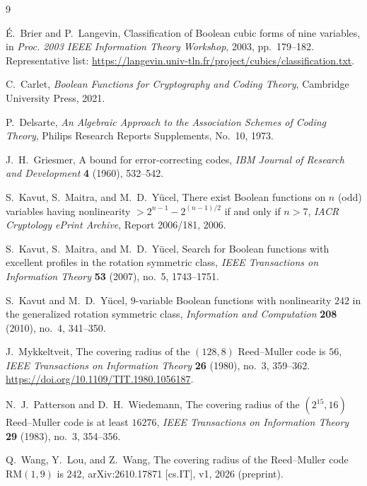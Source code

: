 \documentclass[11pt]{article}
\theoremstyle{definition}
\begin{document}
\begin{thebibliography}{9}

\'E.~Brier and P.~Langevin,
Classification of Boolean cubic forms of nine variables,
in \emph{Proc. 2003 IEEE Information Theory Workshop}, 2003, pp.~179--182.
Representative list: \url{https://langevin.univ-tln.fr/project/cubics/classification.txt}.

C.~Carlet,
\emph{Boolean Functions for Cryptography and Coding Theory},
Cambridge University Press, 2021.

P.~Delsarte,
\emph{An Algebraic Approach to the Association Schemes of Coding Theory},
Philips Research Reports Supplements, No.~10, 1973.

J.~H.~Griesmer,
A bound for error-correcting codes,
\emph{IBM Journal of Research and Development} \textbf{4} (1960), 532--542.

S.~Kavut, S.~Maitra, and M.~D.~Y\"ucel,
There exist Boolean functions on $n$ (odd) variables having nonlinearity $> 2^{n-1} - 2^{(n-1)/2}$ if and only if $n > 7$,
\emph{IACR Cryptology ePrint Archive}, Report 2006/181, 2006.

S.~Kavut, S.~Maitra, and M.~D.~Y\"ucel,
Search for Boolean functions with excellent profiles in the rotation symmetric class,
\emph{IEEE Transactions on Information Theory} \textbf{53} (2007), no.~5, 1743--1751.

S.~Kavut and M.~D.~Y\"ucel,
$9$-variable Boolean functions with nonlinearity $242$ in the generalized rotation symmetric class,
\emph{Information and Computation} \textbf{208} (2010), no.~4, 341--350.

J.~Mykkeltveit,
The covering radius of the $(128,8)$ Reed--Muller code is $56$,
\emph{IEEE Transactions on Information Theory} \textbf{26} (1980), no.~3, 359--362.
\url{https://doi.org/10.1109/TIT.1980.1056187}.

N.~J.~Patterson and D.~H.~Wiedemann,
The covering radius of the $(2^{15}, 16)$ Reed--Muller code is at least $16276$,
\emph{IEEE Transactions on Information Theory} \textbf{29} (1983), no.~3, 354--356.

Q.~Wang, Y.~Lou, and Z.~Wang,
The covering radius of the Reed--Muller code $\mathrm{RM}(1,9)$ is $242$,
arXiv:2610.17871 [cs.IT], v1, 2026 (preprint).

\end{thebibliography}
\end{document}
